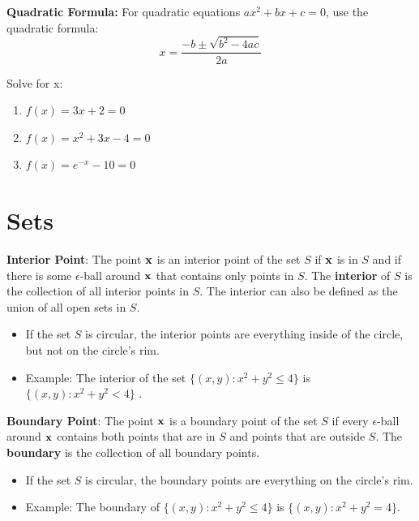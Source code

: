 \documentclass[]{book}
\providecommand{\tightlist}{%
  \setlength{\itemsep}{0pt}\setlength{\parskip}{0pt}}
\theoremstyle{definition}
\theoremstyle{definition}
\theoremstyle{definition}
\theoremstyle{remark}
\let\BeginKnitrBlock\begin \let\EndKnitrBlock\end
\begin{document}
\textbf{Quadratic Formula:} For quadratic equations \(ax^2+bx+c=0\), use the quadratic formula: \[x=\frac{-b\pm\sqrt{b^2-4ac}}{2a}\]

\BeginKnitrBlock{exercise}[Finding Roots]
\protect\hypertarget{exr:solvevar1}{}{\label{exr:solvevar1} {} }
Solve for x:

\begin{enumerate}
\def\labelenumi{\arabic{enumi}.}
\item
  \(f(x)=3x+2 = 0\)
\item
  \(f(x)=x^2+3x-4=0\)
\item
  \(f(x)=e^{-x}-10 = 0\)
\end{enumerate}
\EndKnitrBlock{exercise}

\hypertarget{sets}{%
\section{Sets}\label{sets}}

\textbf{Interior Point}: The point \(\bf x\) is an interior point of the set \(S\) if \(\bf x\) is in \(S\) and if there is some \(\epsilon\)-ball around \(\bf x\) that contains only points in \(S\). The \textbf{interior} of \(S\) is the collection of all interior points in \(S\). The interior can also be defined as the union of all open sets in \(S\).

\begin{itemize}
\tightlist
\item
  If the set \(S\) is circular, the interior points are everything inside of the circle, but not on the circle's rim.
\item
  Example: The interior of the set \(\{ (x,y) : x^2+y^2\le 4 \}\) is \(\{ (x,y) : x^2+y^2< 4 \}\) .
\end{itemize}

\textbf{Boundary Point}: The point \(\bf x\) is a boundary point of the set \(S\) if every \(\epsilon\)-ball around \(\bf x\) contains both points that are in \(S\) and points that are outside \(S\). The \textbf{boundary} is the collection of all boundary points.

\begin{itemize}
\tightlist
\item
  If the set \(S\) is circular, the boundary points are everything on the circle's rim.
\item
  Example: The boundary of \(\{ (x,y) : x^2+y^2\le 4 \}\) is \(\{ (x,y) : x^2+y^2 = 4 \}\).
\end{itemize}
\end{document}
